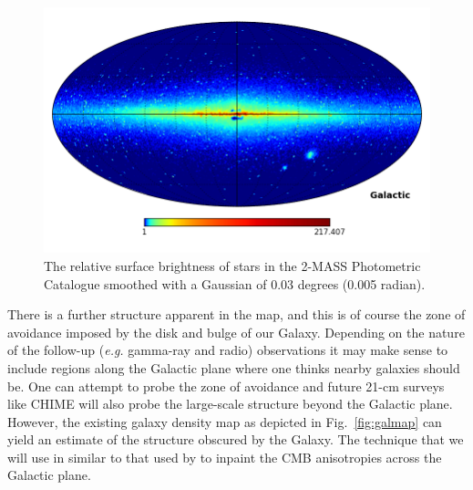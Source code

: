 \documentclass[useAMS,usenatbib]{mn2e}
\begin{document}
\begin{figure}
  \includegraphics[width=\columnwidth]{2mass_density}
  \caption{The relative surface brightness of stars in the 2-MASS
    Photometric Catalogue \citep{2006AJ....131.1163S} smoothed with a Gaussian of 0.03 degrees (0.005 radian).}
  \label{fig:starmap}
\end{figure}
There is a further structure apparent in the map, and this is of
course the zone of avoidance imposed by the disk and bulge of our
Galaxy. Depending on the nature of the follow-up
({\em e.g.} gamma-ray and radio) observations it may make
sense to include regions along the Galactic plane where one thinks
nearby galaxies should be. One can attempt to probe the zone of avoidance
\citep[e.g][]{2000AJ....120..298J} and future 21-cm surveys like CHIME
\citep{2014era..conf10102V} will also probe the large-scale structure
beyond the Galactic plane.   However, the existing galaxy density map
as depicted in Fig.~\ref{fig:galmap} can yield an estimate of the
structure obscured by the Galaxy.  The technique that we will use in
similar to that used by \citet{2008StMet...5..289A} to inpaint the CMB
anisotropies across the Galactic plane.
\end{document}
